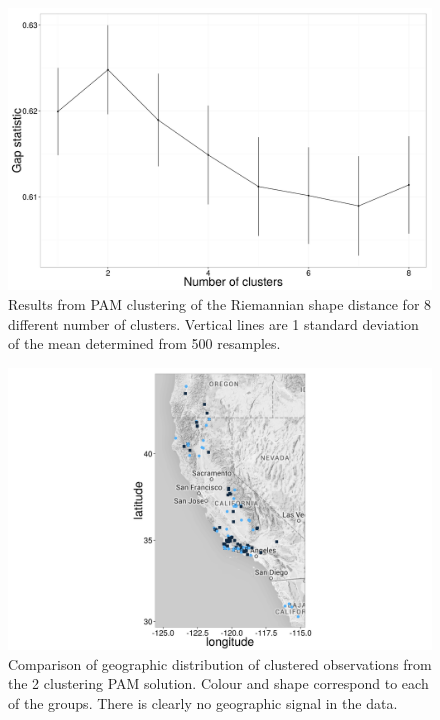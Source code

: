 \documentclass[12pt,letterpaper]{article}
\begin{document}
\begin{figure}[ht]
  \centering
  \includegraphics[height = \textheight, width = \textwidth, keepaspectratio = true]{figure/gap_res}
  \caption{Results from PAM clustering of the Riemannian shape distance for 8 different number of clusters. Vertical lines are 1 standard deviation of the mean determined from 500 resamples.}
  \label{fig:gap}
\end{figure}

\begin{figure}[ht]
  \centering
  \includegraphics[height = \textheight, width = \textwidth, keepaspectratio = true]{figure/gap_map}
  \caption{Comparison of geographic distribution of clustered observations from the 2 clustering PAM solution. Colour and shape correspond to each of the groups. There is clearly no geographic signal in the data.}
  \label{fig:gap_map}
\end{figure}
\end{document}

